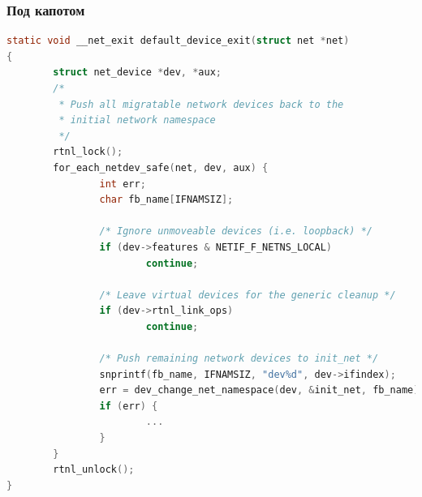 \begin{frame}[fragile, label={}]
\frametitle{Под капотом}
\begin{block}{}
    \begin{lstlisting}[language=c, basicstyle={\fontsize{6}{6}\ttfamily}]
static void __net_exit default_device_exit(struct net *net)
{
        struct net_device *dev, *aux;
        /*
         * Push all migratable network devices back to the
         * initial network namespace
         */
        rtnl_lock();
        for_each_netdev_safe(net, dev, aux) {
                int err;
                char fb_name[IFNAMSIZ];

                /* Ignore unmoveable devices (i.e. loopback) */
                if (dev->features & NETIF_F_NETNS_LOCAL)
                        continue;

                /* Leave virtual devices for the generic cleanup */
                if (dev->rtnl_link_ops)
                        continue;

                /* Push remaining network devices to init_net */
                snprintf(fb_name, IFNAMSIZ, "dev%d", dev->ifindex);
                err = dev_change_net_namespace(dev, &init_net, fb_name);
                if (err) {
                        ...
                }
        }
        rtnl_unlock();
}
\end{lstlisting}
\end{block}
\end{frame}



